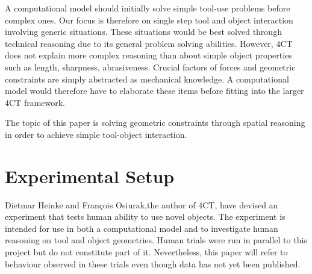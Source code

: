 \documentclass[11]{article}
\begin{document}
A computational model should initially solve simple tool-use problems before complex ones.
Our focus is therefore on single step tool and object interaction involving generic situations.
These situations would be best solved through technical reasoning due to its general problem solving abilities. 
However, 4CT does not explain more complex reasoning than about simple object properties such as length, sharpness, abrasiveness.
Crucial factors of forces and geometric constraints are simply abstracted as mechanical knowledge. 
A computational model would therefore have to elaborate these items before fitting into the larger 4CT framework. 

The topic of this paper is solving geometric constraints through spatial reasoning in order to achieve simple tool-object interaction.  

\section{Experimental Setup}

Dietmar Heinke and Fran\c{c}ois Osiurak,the author of 4CT, have devised an experiment that tests human ability to use novel objects. 
The experiment is intended for use in both a computational model and to investigate human reasoning on tool and object geometries. 
Human trials were run in parallel to this project but do not constitute part of it. 
Nevertheless, this paper will refer to behaviour observed in these trials even though data has not yet been published. 
\end{document}
